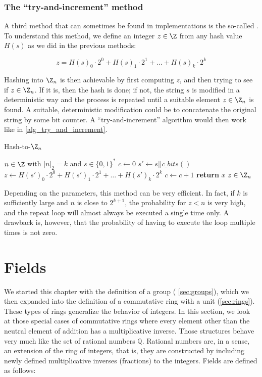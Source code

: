 \subsubsection{The ``try-and-increment'' method}\label{def:try_and_increment_hash}

A third method that can sometimes be found in implementations is the so-called . To understand this method, we define an integer $z\in\Z$ from any hash value $H(s)$ as we did in the previous methods:

\begin{equation}
z = H(s)_0\cdot 2^0 + H(s)_1\cdot 2^1 + \ldots + H(s)_{k}\cdot 2^{k}
\end{equation}

Hashing into $\Z_n$ is then achievable by first computing $z$, and then trying to see if $z\in\Z_n$. If it is, then the hash is done; if not, the string $s$ is modified in a deterministic way and the process is repeated until a suitable element $z\in\Z_n$ is found. A suitable, deterministic modification could be to concatenate the original string by some bit counter. A ``try-and-increment'' algorithm would then work like in \algname{} \ref{alg_try_and_increment}.
\begin{algorithm}\caption{Hash-to-$\Z_n$}
\label{alg_try_and_increment}
\begin{algorithmic}[0]
\Require $n \in \Z$ with $|n|_2=k$ and $s\in\{0,1\}^*$
\State $c \gets 0$
\Repeat
\State $s' \gets s||c\_bits()$
\State $z \gets H(s')_0\cdot 2^0 + H(s')_1\cdot 2^1 + \ldots + H(s')_{k}\cdot 2^{k}$
\State $c\gets c+1$
\State \textbf{return} $x$
\EndProcedure
\Ensure $ z\in \Z_n$
\end{algorithmic}
\end{algorithm}

Depending on the parameters, this method can be very efficient. In fact, if $k$ is sufficiently large and $n$ is close to $2^{k+1}$, the probability for $z<n$ is very high, and the repeat loop will almost always be executed a single time only. A drawback is, however, that the probability of having to execute the loop multiple times is not zero.

\section{Fields}\label{sec:fields}
We started this chapter with the definition of a group (\secname{} \ref{sec:groups}), which we then expanded into the definition of a commutative ring with a unit (\secname \ref{sec:rings}). These types of rings generalize the behavior of integers. In this section, we look at those special cases of commutative rings where every element other than the neutral element of addition has a multiplicative inverse. Those structures behave very much like the set of rational numbers $\mathbb{Q}$. Rational numbers are, in a sense, an extension of the ring of integers, that is, they are constructed by including newly defined multiplicative inverses (fractions) to the integers. Fields are defined as follows:

